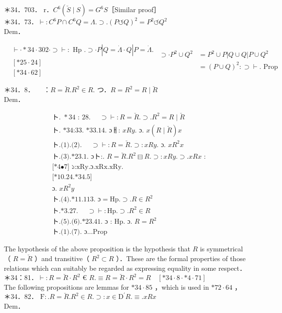 \documentclass[10pt]{article}
\begin{document}
＊34．703． r．$C^{6}(\breve{S} \mid S)=G^{6} S$［Similar proof］\\
＊34．73．$\vdash: C^{6} P \cap C^{6} Q=\Lambda . \supset .(P \circlearrowleft Q)^{2}=P^{2} \circlearrowleft Q^{2}$\\
Dem．

$$
\begin{aligned}
& \vdash \cdot * 34 \cdot 302 \cdot \supset \vdash: \text { Hp } . \supset \cdot P|Q=\dot{\Lambda} \cdot Q| P=\dot{\Lambda} . \\
& {[* 25 \cdot 24]} \\
& {[* 34 \cdot 62]}
\end{aligned} \begin{aligned}
\supset \cdot P^{2} \cup Q^{2} & =P^{2} \cup P|Q \cup Q| P \cup Q^{2} \\
& =(P \cup Q)^{2}: \supset \vdash . \text { Prop }
\end{aligned}
$$

＊34．8．$\quad$ ：$R=\breve{R} . R^{2} \in R$. つ．$R=R^{2}=R \mid \breve{R}$\\
Dem．


\begin{align*}
& \text { ト. } * 34 \text { : 28. } \quad \supset \vdash: R=\breve{R} . \supset . R^{2}=R \mid \breve{R}  \tag{1}\\
& \text { ト. *34:33. *33.14. ɔㅐ: } x R y . \text { ɔ. } x(R \mid \breve{R}) x  \tag{2}\\
& \text { ト.(1).(2). } \quad \supset \vdash: R=\breve{R} . \supset: x R y . \text { ɔ. } x R^{2} x  \tag{3}\\
& \text { ト.(3).*23.1. ɔト:. } R=\breve{R} . R^{2} \boxminus R . \supset: x R y . \supset . x R x \text { : } \\
& \text { [*4•7] ১:xRy.ɔ.xRx.xRy. } \\
& \text { [*10.24.*34.5] } \\
& \text { ɔ. } x R^{2} y  \tag{4}\\
& \text { ト.(4).*11.113. ɔ}=\mathrm{Hp} . \supset . R \in R^{2}  \tag{5}\\
& \text { ト.*3.27. } \quad \supset \vdash: \mathrm{Hp} . \supset . R^{2} \in R  \tag{6}\\
& \text { ト.(5).(6).*23.41. ɔ : Hp. ɔ. } R=R^{2}  \tag{7}\\
& \text { ト.(1).(7). ɔ…Prop }
\end{align*}


The hypothesis of the above proposition is the hypothesis that $R$ is symmetrical（ $R=\breve{R}$ ）and transitive（ $R^{2} \subset R$ ）．These are the formal properties of those relations which can suitably be regarded as expressing equality in some respect．\\
＊34：81．$\vdash: R=\breve{R} \cdot R^{2}$ € $R . \equiv R=\breve{R} \cdot R^{2}=R \quad[* 34 \cdot 8 \cdot * 4 \cdot 71]$\\
The following propositions are lemmas for $* 34 \cdot 85$ ，which is used in $* 72 \cdot 64$ ，\\
＊34．82． $\mathrm{F}: . R=\breve{R} . R^{2} \in R . \supset: x \in \mathrm{D}^{\prime} R . \equiv . x R x$\\
Dem．
\end{document}
